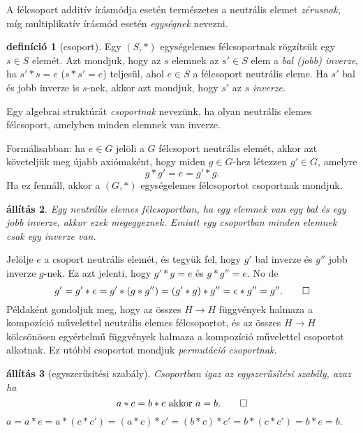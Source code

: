 \documentclass[a4paper, showtrims]{memoir}
\makeatletter
\renewenvironment{proof}[1][\proofname]
    {\par\pushQED{\qed}%
    \normalfont \topsep6\p@\@plus6\p@\relax
    \trivlist
    \item[\hskip\labelsep
        \itshape
    #1\@addpunct{:}]\ignorespaces}
    {\popQED\endtrivlist\@endpefalse}
\theoremstyle{plain}
\newtheorem{proposition}{állítás}[chapter]
\theoremstyle{remark}
\theoremstyle{definition}
\newtheorem{definition}[proposition]{definíció}
\makeatother
\begin{document}
A félcsoport additív írásmódja esetén természetes a neutrális elemet \emph{zérusnak},
míg multiplikatív írásmód esetén \emph{egységnek} nevezni.
\begin{definition}[csoport]
    Egy $\left( S,\ast \right)$ egységelemes félcsoportnak rögzítsük egy $s\in S$ elemét.
    Azt mondjuk, hogy az $s$ elemnek az $s'\in S$ elem a \emph{bal (jobb) inverze},
    ha $s'\ast s=e$ ($s\ast s'=e$) teljesül,
    ahol $e\in S$ a félcsoport neutrális eleme.
    Ha $s'$ bal és jobb inverze is $s$-nek, akkor azt mondjuk, hogy $s'$ az $s$ \emph{inverze}.
    
    Egy algebrai struktúrát \emph{csoportnak} nevezünk,
    ha olyan neutrális elemes félcsoport, amelyben minden elemnek van inverze.
\end{definition}
Formálisabban: ha $e\in G$ jelöli a $G$ félcsoport neutrális elemét,
    akkor azt követeljük meg újabb axiómaként, 
    hogy miden $g\in G$-hez létezzen $g'\in G$, amelyre
	\[
		g\ast g'=e=g'\ast g.\tag{\dag}
	\]
    Ha ez fennáll, akkor a $(G,\ast)$ egységelemes félcsoportot csoportnak mondjuk.
\begin{proposition}
    Egy neutrális elemes félcsoportban, 
    ha egy elemnek van egy bal és egy jobb inverze,
    akkor ezek megegyeznek.
    Emiatt egy csoportban minden elemnek csak egy inverze van.
\end{proposition}
\begin{proof}
	Jelölje $e$ a csoport neutrális elemét,
	és tegyük fel, hogy $g'$ bal inverze és $g''$ jobb inverze $g$-nek.
	Ez azt jelenti, 
    hogy $g'\ast g=e$ és $g\ast g''=e$.
    No de
	\[
		g'=g'\ast e=
		g'\ast\left( g\ast g'' \right)=
		\left(g'\ast g\right)\ast g'' =
		e\ast g''=g''.\qedhere
	\]
\end{proof}
Példaként gondoljuk meg, hogy az összes $H\to H$ függvények halmaza a kompozíció művelettel
neutrális elemes félcsoportot,
és az összes $H\to H$ kölcsönösen egyértelmű függvények halmaza a kompozíció művelettel csoportot alkotnak.
Ez utóbbi csoportot mondjuk \emph{permutáció csoportnak}.
\begin{proposition}[egyszerűsítési szabály]
	Csoportban igaz az egyszerűsítési szabály, azaz ha
	\[
        a\ast c=b\ast c\text{ akkor } a=b.\qedhere
	\]
\end{proposition}
\begin{proof}
	\begin{math}
		a=a\ast e
		=
		a\ast \left( c\ast c'\right)=
		\left( a\ast c \right)\ast c'=
		\left( b\ast c \right)\ast c'=
		b\ast\left( c\ast c' \right)=
		b\ast e=
		b.
	\end{math}
\end{proof}
\end{document}
